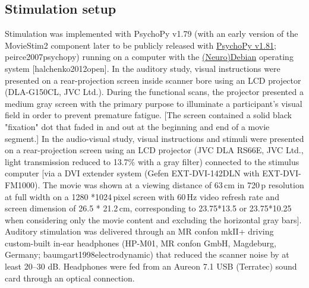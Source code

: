 \documentclass[english]{article}
\begin{document}
\subsection{Stimulation setup}
Stimulation was implemented with PsychoPy v1.79 (with an early version of the MovieStim2 component later to be publicly released with \href{http://www.psychopy.org}{PsychoPy v1.81}; {peirce2007psychopy}) running on a computer with the \href{http://neuro.debian.net}{(Neuro)Debian} operating system [halchenko2012open].
In the auditory study, visual instructions were presented on a rear-projection screen inside scanner bore using an LCD projector (DLA-G150CL, JVC Ltd.). During the functional scans, the projector presented a medium gray screen with the primary purpose to illuminate a participant’s visual field in order to prevent premature fatigue. [The screen contained a solid black "fixation" dot that faded in and out at the beginning and end of a movie segment.]
In the audio-visual study, visual instructions and stimuli were presented on a rear-projection screen using an LCD projector (JVC DLA RS66E, JVC Ltd., light transmission reduced to 13.7\% with a gray filter) connected to the stimulus computer [via a DVI extender system (Gefen EXT-DVI-142DLN with EXT-DVI-FM1000). The movie was shown at a viewing distance of 63\,cm in 720\,p resolution at full width on a 1280 *1024\,pixel screen with 60\,Hz video refresh rate and screen dimension of 26.5 * 21.2\,cm, corresponding to 23.75*13.5 or 23.75*10.25 when considering only the movie content and excluding the horizontal gray bars].
Auditory stimulation was delivered through an MR confon mkII+ driving custom-built in-ear headphones (HP-M01, MR confon GmbH, Magdeburg, Germany; {baumgart1998electrodynamic}) that reduced the scanner noise by at least 20–30 dB. Headphones were  fed from an Aureon 7.1 USB (Terratec) sound card through an optical connection.
\end{document}
